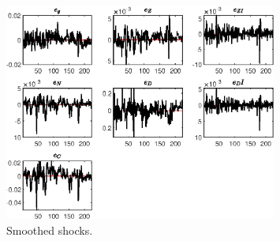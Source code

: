  
\begin{figure}[H]
\centering 
\includegraphics[width=0.80\textwidth]{BRS_growth/graphs/BRS_growth_SmoothedShocks1}
\caption{Smoothed shocks.}\label{Fig:SmoothedShocks:1}
\end{figure}


